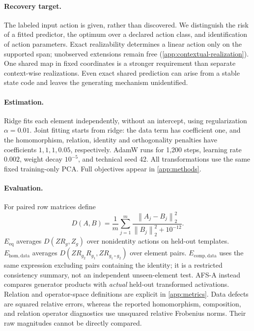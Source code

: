 \documentclass{article}
\newcommand{\norm}[1]{\left\lVert #1\right\rVert}
\newcommand{\Eeq}{E_{\mathrm{eq}}}
\newcommand{\Ehom}{E_{\mathrm{hom,data}}}
\newcommand{\Ecomp}{E_{\mathrm{comp,data}}}
\begin{document}
\paragraph{Recovery target.}
The labeled input action is given, rather than discovered. We distinguish the risk of a fitted predictor, the optimum over a declared action class, and identification of action parameters. Exact realizability determines a linear action only on the supported span; unobserved extensions remain free (\cref{app:contextual-realization}). One shared map in fixed coordinates is a stronger requirement than separate context-wise realizations. Even exact shared prediction can arise from a stable state code and leaves the generating mechanism unidentified.

\paragraph{Estimation.}
Ridge fits each element independently, without an intercept, using regularization $\alpha=0.01$. Joint fitting starts from ridge: the data term has coefficient one, and the homomorphism, relation, identity and orthogonality penalties have coefficients $1,1,1,0.05$, respectively. AdamW runs for 1,200 steps, learning rate $0.002$, weight decay $10^{-5}$, and technical seed 42. All transformations use the same fixed training-only PCA. Full objectives appear in \cref{app:methods}.

\paragraph{Evaluation.}
For paired row matrices define
\begin{equation}
 D(A,B)=\frac{1}{m}\sum_{j=1}^m
 \frac{\norm{A_j-B_j}_2^2}{\norm{B_j}_2^2+10^{-12}}.
 \label{eq:D}
\end{equation}
$\Eeq$ averages $D(ZR_g,Z_g)$ over nonidentity actions on held-out templates. $\Ehom$ averages $D(ZR_{g_2}R_{g_1},ZR_{g_1\circ g_2})$ over element pairs. $\Ecomp$ uses the same expression excluding pairs containing the identity; it is a restricted consistency summary, not an independent unseen-element test. AFS-A instead compares generator products with \emph{actual} held-out transformed activations. Relation and operator-space definitions are explicit in \cref{app:metrics}. Data defects are squared relative errors, whereas the reported homomorphism, composition, and relation operator diagnostics use unsquared relative Frobenius norms. Their raw magnitudes cannot be directly compared.
\end{document}
